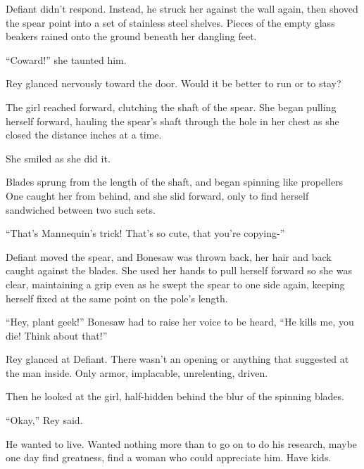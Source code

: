 Defiant didn't respond.  Instead, he struck her against the wall again, then shoved the spear point into a set of stainless steel shelves.  Pieces of the empty glass beakers rained onto the ground beneath her dangling feet.



``Coward!'' she taunted him.



Rey glanced nervously toward the door.  Would it be better to run or to stay?



The girl reached forward, clutching the shaft of the spear.  She began pulling herself forward, hauling the spear's shaft through the hole in her chest as she closed the distance inches at a time.



She smiled as she did it.



Blades sprung from the length of the shaft, and began spinning like propellers   One caught her from behind, and she slid forward, only to find herself sandwiched between two such sets.



``That's Mannequin's trick!  That's so cute, that you're copying-''



Defiant moved the spear, and Bonesaw was thrown back, her hair and back caught against the blades.  She used her hands to pull herself forward so she was clear, maintaining a grip even as he swept the spear to one side again, keeping herself fixed at the same point on the pole's length.



``Hey, plant geek!'' Bonesaw had to raise her voice to be heard, ``He kills me, you die!  Think about that!''



Rey glanced at Defiant.  There wasn't an opening or anything that suggested at the man inside.  Only armor, implacable, unrelenting, driven.



Then he looked at the girl, half-hidden behind the blur of the spinning blades.



``Okay,'' Rey said.



He wanted to live.  Wanted nothing more than to go on to do his research, maybe one day find greatness, find a woman who could appreciate him.  Have kids.



